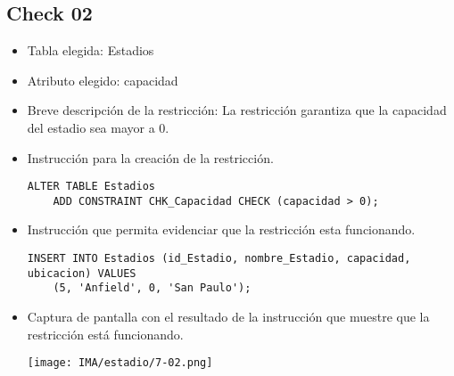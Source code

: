 \subsection*{Check 02}
\begin{itemize}
    \item Tabla elegida: Estadios
    \item Atributo elegido: capacidad
    \item Breve descripción de la restricción: La restricción garantiza que la capacidad del estadio sea mayor a 0.
    \item Instrucción para la creación de la restricción.
    \begin{lstlisting}[caption={Tablas para la BdDatos}, label={lst:sql_estadios}]
    ALTER TABLE Estadios
    ADD CONSTRAINT CHK_Capacidad CHECK (capacidad > 0);
    \end{lstlisting}

    \item Instrucción que permita evidenciar que la restricción esta funcionando.
    \begin{lstlisting}[caption={Tablas para la BdDatos}, label={lst:sql_estadios}]
    INSERT INTO Estadios (id_Estadio, nombre_Estadio, capacidad, ubicacion) VALUES 
    (5, 'Anfield', 0, 'San Paulo'); 
    \end{lstlisting}

    \item Captura de pantalla con el resultado de la instrucción que muestre que la restricción está
    funcionando.
    \begin{center}
        \texttt{[image: IMA/estadio/7-02.png]}
    \end{center}
\end{itemize}


